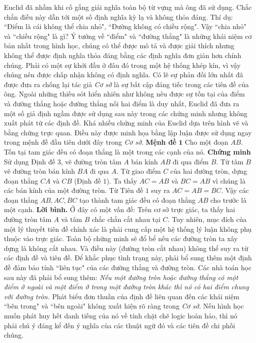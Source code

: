\begin{multicols}{2}
	Euclid đã nhầm khi cố gắng giải nghĩa toàn bộ từ vựng mà ông đã sử dụng. Chắc chắn điều này dẫn tới một số định nghĩa kỳ lạ và không thỏa đáng. Thí dụ: ``Điểm là cái không thể chia nhỏ", ``Đường không có chiều rộng". Vậy ``chia nhỏ" và ``chiều rộng" là gì? Ý tưởng về ``điểm" và ``đường thẳng" là những khái niệm cơ bản nhất trong hình học, chúng có thể được mô tả và được giải thích nhưng không thể được định nghĩa thỏa đáng bằng các định nghĩa đơn giản hơn chính chúng. Phải có một sự khởi đầu ở đâu đó trong một hệ thống khép kín, vì vậy chúng nên được chấp nhận không có định nghĩa.
	\vskip 0.1cm
	Có lẽ sự phản đối lớn nhất đã được đưa ra chống lại tác giả \textit{Cơ sở} là sự bất cập đáng tiếc trong các tiên đề của ông. Ngoài những thiếu sót hiển nhiên như  không nêu được sự tồn tại của điểm và đường thẳng hoặc đường thẳng nối hai điểm là duy nhất, Euclid đã đưa ra một số giả định ngầm được sử dụng sau này trong các chứng minh nhưng không xuất phát từ các định đề. Khá nhiều chứng minh của Euclid dựa trên hình vẽ và bằng chứng trực quan. Điều này được minh họa bằng lập luận được sử dụng ngay trong mệnh đề đầu tiên dưới đây trong \textit{Cơ sở}.
	\vskip 0.1cm 
	\textbf{\color{lichsutoanhoc}Mệnh đề} $\pmb{1}$ Cho một đoạn $AB$. Tồn tại tam giác đều có đoạn thẳng là một trong các cạnh của nó.
	\vskip 0.1cm
	\textbf{\color{lichsutoanhoc}Chứng minh} Sử dụng Định đề $3$, vẽ đường tròn tâm $A$ bán kính $AB$ đi qua điểm $B$. Từ tâm $B$ vẽ đường tròn bán kính $BA$ đi qua $A$. Từ giao điểm $C$ của hai đường tròn, dựng đoạn thẳng $CA$ và $CB$ (Định đề $1$).  Ta thấy $AC=AB$ và $BC=AB$ vì chúng là các bán kính của một đường tròn. Từ Tiên đề $1$ suy ra $AC=AB=BC$. Vậy các đoạn thẳng $AB, AC, BC$ tạo thành tam giác đều có đoạn thẳng $AB$ cho trước là một cạnh.
	\vskip 0.1cm
	\textbf{\color{lichsutoanhoc}Lời bình.} Ở đây có một vấn đề: Trên cơ sở trực giác, ta thấy hai đường tròn tâm $A$ và tâm $B$ chắc chắn cắt nhau tại $C$.  Tuy nhiên, mục đích của một lý thuyết tiên đề chính xác là phải cung cấp một hệ thống lý luận không phụ thuộc vào trực giác. Toàn bộ chứng minh sẽ đổ bể nếu các đường tròn ta xây dựng là không cắt nhau. Và điều này (đường tròn cắt nhau) không thể suy ra từ các định đề và tiên đề. Để khắc phục tình trạng này, phải bổ sung thêm một định đề đảm bảo tính ``liên tục" của các đường thẳng và đường tròn. Các nhà toán học sau này đã phải bổ sung thêm:
	\vskip 0.1cm
	\textit{Nếu một đường tròn hoặc đường thẳng có một điểm ở ngoài và một điểm ở trong một đường tròn khác thì nó có hai điểm chung với đường tròn.}
	\vskip 0.1cm 
	Phát biểu đơn thuần của định đề liên quan đến các khái niệm ``bên trong" và ``bên ngoài" không xuất hiện rõ ràng trong \textit{Cơ sở}. Nếu hình học muốn phát huy hết danh tiếng của nó về tính chặt chẽ logic hoàn hảo, thì nó phải chú ý đáng kể đến ý nghĩa của các thuật ngữ đó và các tiên đề chi phối chúng. 

\end{multicols}
